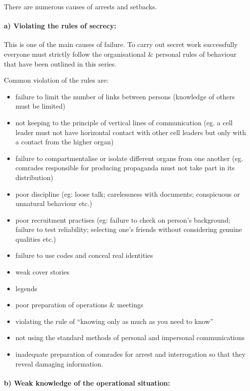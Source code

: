 There are numerous causes of arrests and setbacks.

\paragraph{a) Violating the rules of secrecy:}

This is one of the main causes of failure. To carry out secret work
successfully everyone must strictly follow the organisational \&
personal rules of behaviour that have been outlined in this series.

Common violation of the rules are:

\begin{itemize}
\tightlist
\item
  failure to limit the number of links between persons (knowledge of
  others must be limited)
\item
  not keeping to the principle of vertical lines of communication (eg. a
  cell leader must not have horizontal contact with other cell leaders
  but only with a contact from the higher organ)
\item
  failure to compartmentalise or isolate different organs from one
  another (eg. comrades responsible for producing propaganda must not
  take part in its distribution)
\item
  poor discipline (eg: loose talk; carelessness with documents;
  conspicuous or unnatural behaviour etc.)
\item
  poor recruitment practises (eg: failure to check on person's
  background; failure to test reliability; selecting one's friends
  without considering genuine qualities etc.)
\item
  failure to use codes and conceal real identities
\item
  weak cover stories
\item
  legends
\item
  poor preparation of operations \& meetings
\item
  violating the rule of ``knowing only as much as you need to know''
\item
  not using the standard methods of personal and impersonal
  communications
\item
  inadequate preparation of comrades for arrest and interrogation so
  that they reveal damaging information.
\end{itemize}

\paragraph{b) Weak knowledge of the operational situation:}

